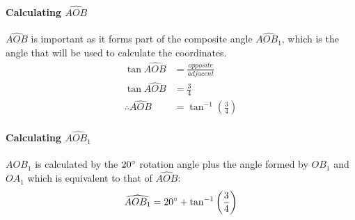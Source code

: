 \documentclass{article}
\begin{document}
            \paragraph{Calculating $\widehat{AOB}$} $\widehat{AOB}$ is important as it forms part of the composite angle $\widehat{AOB_1}$, which is the angle that will be used to calculate the coordinates.
            \begin{align*}
                \tan{\widehat{AOB}} &= \frac{opposite}{adjacent} \\
                \tan{\widehat{AOB}} &= \frac{3}{4} \\
                \therefore \widehat{AOB} &= \tan^{-1}{\left(\frac{3}{4}\right)}
            \end{align*}
            \paragraph{Calculating $\widehat{AOB_1}$} $AOB_1$ is calculated by the $20\degree$ rotation angle plus the angle formed by $OB_1$ and $OA_1$ which is equivalent to that of $\widehat{AOB}$:
            \begin{equation*}
                \widehat{AOB_1} = 20\degree + \tan^{-1}{\left(\frac{3}{4}\right)}
            \end{equation*}
\end{document}
